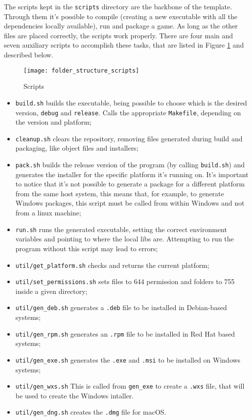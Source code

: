 The scripts kept in the \texttt{scripts} directory are the backbone of the template. Through them it's possible to compile (creating a new executable with all the dependencies locally available), run and package a game. As long as the other files are placed correctly, the scripts work properly. There are four main and seven auxiliary scripts to accomplish these tasks, that are listed in Figure \ref{fig:folder_structure_scripts} and described below.

\begin{figure}[h!]
\centering
\texttt{[image: folder\_structure\_scripts]}
\caption{Scripts}
\label{fig:folder_structure_scripts}
\end{figure}

\begin{itemize}
	\item \texttt{build.sh} builds the executable, being possible to choose which is the desired version, \texttt{debug} and \texttt{release}. Calls the appropriate \texttt{Makefile}, depending on the version and platform;
	\item \texttt{cleanup.sh} clears the repository, removing files generated during build and packaging, like object files and installers;
	\item \texttt{pack.sh} builds the release version of the program (by calling \texttt{build.sh}) and generates the installer for the specific platform it's running on. It's important to notice that it's not possible to generate a package for a different platform from the same host system, this means that, for example, to generate Windows packages, this script must be called from within Windows and not from a linux machine;
	\item \texttt{run.sh} runs the generated executable, setting the correct environment variables and pointing to where the local libs are. Attempting to run the program without this script may lead to errors;
	\item \texttt{util/get\_platform.sh} checks and returns the current platform;
	\item \texttt{util/set\_permissions.sh} sets files to 644 permission and folders to 755 inside a given directory;
	\item \texttt{util/gen\_deb.sh} generates a \texttt{.deb} file to be installed in Debian-based systems;
	\item \texttt{util/gen\_rpm.sh} generates an \texttt{.rpm} file to be installed in Red Hat based systems;
	\item \texttt{util/gen\_exe.sh} generates the \texttt{.exe} and \texttt{.msi} to be installed on Windows systems;
	\item \texttt{util/gen\_wxs.sh} This is called from \texttt{gen\_exe} to create a \texttt{.wxs} file, that will be used to create the Windows intaller.
	\item \texttt{util/gen\_dng.sh} creates the \texttt{.dmg} file for macOS.
\end{itemize}


